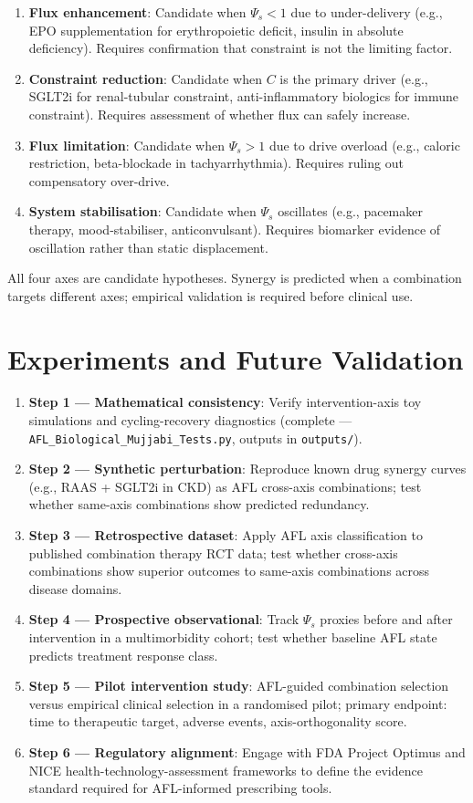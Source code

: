 \documentclass[12pt,a4paper]{article}
\begin{document}
\begin{enumerate}
  \item \textbf{Flux enhancement}: Candidate when $\Psi_s < 1$ due to under-delivery (e.g., EPO supplementation for erythropoietic deficit, insulin in absolute deficiency). Requires confirmation that constraint is not the limiting factor.
  \item \textbf{Constraint reduction}: Candidate when $C$ is the primary driver (e.g., SGLT2i for renal-tubular constraint, anti-inflammatory biologics for immune constraint). Requires assessment of whether flux can safely increase.
  \item \textbf{Flux limitation}: Candidate when $\Psi_s > 1$ due to drive overload (e.g., caloric restriction, beta-blockade in tachyarrhythmia). Requires ruling out compensatory over-drive.
  \item \textbf{System stabilisation}: Candidate when $\Psi_s$ oscillates (e.g., pacemaker therapy, mood-stabiliser, anticonvulsant). Requires biomarker evidence of oscillation rather than static displacement.
\end{enumerate}

All four axes are candidate hypotheses. Synergy is predicted when a combination targets different axes; empirical validation is required before clinical use.

\section{Experiments and Future Validation}

\begin{enumerate}
  \item \textbf{Step 1 --- Mathematical consistency}: Verify intervention-axis toy simulations and cycling-recovery diagnostics (complete --- \texttt{AFL\_Biological\_Mujjabi\_Tests.py}, outputs in \texttt{outputs/}).
  \item \textbf{Step 2 --- Synthetic perturbation}: Reproduce known drug synergy curves (e.g., RAAS + SGLT2i in CKD) as AFL cross-axis combinations; test whether same-axis combinations show predicted redundancy.
  \item \textbf{Step 3 --- Retrospective dataset}: Apply AFL axis classification to published combination therapy RCT data; test whether cross-axis combinations show superior outcomes to same-axis combinations across disease domains.
  \item \textbf{Step 4 --- Prospective observational}: Track $\Psi_s$ proxies before and after intervention in a multimorbidity cohort; test whether baseline AFL state predicts treatment response class.
  \item \textbf{Step 5 --- Pilot intervention study}: AFL-guided combination selection versus empirical clinical selection in a randomised pilot; primary endpoint: time to therapeutic target, adverse events, axis-orthogonality score.
  \item \textbf{Step 6 --- Regulatory alignment}: Engage with FDA Project Optimus and NICE health-technology-assessment frameworks to define the evidence standard required for AFL-informed prescribing tools.
\end{enumerate}
\end{document}
